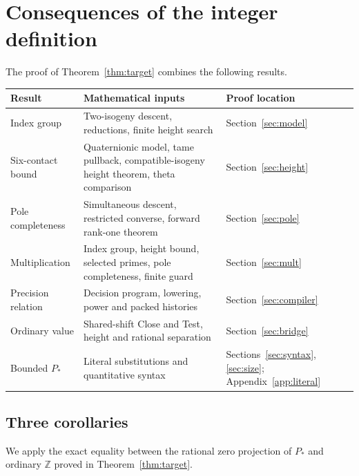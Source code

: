 \documentclass[11pt]{article}
\theoremstyle{definition}
\theoremstyle{remark}
\newcommand{\Z}{\mathbb Z}
\begin{document}
\section{Consequences of the integer definition}
The proof of Theorem~\ref{thm:target} combines the following results.
\begin{center}\small
\begin{tabular}{p{}p{}p{}}
\toprule
Result & Mathematical inputs & Proof location\\\midrule
Index group & Two-isogeny descent, reductions, finite height search &
Section~\ref{sec:model}\\
Six-contact bound & Quaternionic model, tame pullback, compatible-isogeny
height theorem, theta comparison & Section~\ref{sec:height}\\
Pole completeness & Simultaneous descent, restricted converse, forward
rank-one theorem & Section~\ref{sec:pole}\\
Multiplication & Index group, height bound, selected primes,
pole completeness, finite guard & Section~\ref{sec:mult}\\
Precision relation & Decision program, lowering, power and packed histories &
Section~\ref{sec:compiler}\\
Ordinary value & Shared-shift Close and Test, height and rational separation &
Section~\ref{sec:bridge}\\
Bounded $P_*$ & Literal substitutions and quantitative syntax &
Sections~\ref{sec:syntax}, \ref{sec:size}; Appendix~\ref{app:literal}\\\bottomrule
\end{tabular}
\end{center}

\subsection{Three corollaries}\label{sec:four-corollaries}
We apply the exact equality between the rational zero projection of
$P_*$ and ordinary $\Z$ proved in Theorem~\ref{thm:target}.
\end{document}
